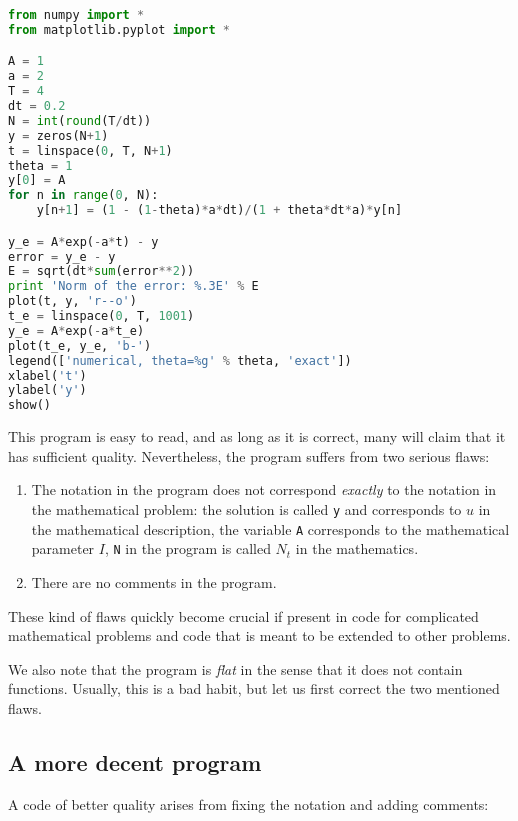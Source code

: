 \documentclass[graybox,sectrefs,envcountresetchap,open=right,final]{svmonodo}
\begin{document}
\begin{lstlisting}[language=python,style=blue1bar_bluegreen]
from numpy import *
from matplotlib.pyplot import *

A = 1
a = 2
T = 4
dt = 0.2
N = int(round(T/dt))
y = zeros(N+1)
t = linspace(0, T, N+1)
theta = 1
y[0] = A
for n in range(0, N):
    y[n+1] = (1 - (1-theta)*a*dt)/(1 + theta*dt*a)*y[n]

y_e = A*exp(-a*t) - y
error = y_e - y
E = sqrt(dt*sum(error**2))
print 'Norm of the error: %.3E' % E
plot(t, y, 'r--o')
t_e = linspace(0, T, 1001)
y_e = A*exp(-a*t_e)
plot(t_e, y_e, 'b-')
legend(['numerical, theta=%g' % theta, 'exact'])
xlabel('t')
ylabel('y')
show()

\end{lstlisting}


This program is easy to read, and as long as it is correct, many will
claim that it has sufficient quality. Nevertheless, the program suffers
from two serious flaws:

\begin{enumerate}
\item The notation in the program does not correspond \emph{exactly} to the notation in the mathematical problem: the solution is called \texttt{y} and corresponds to $u$ in the mathematical description, the variable \texttt{A} corresponds to the mathematical parameter $I$, \texttt{N} in the program is called $N_t$ in the mathematics.

\item There are no comments in the program.
\end{enumerate}

\noindent
These kind of flaws quickly become crucial if present in code for complicated
mathematical problems and code that is meant to be extended to other problems.

We also note that the program is \emph{flat} in the sense that it does
not contain functions. Usually, this is a bad habit, but let us
first correct the two mentioned flaws.

\subsection{A more decent program}
\label{softeng1:basic:impl2}

A code of better quality arises from
fixing the notation and adding comments:
\end{document}
